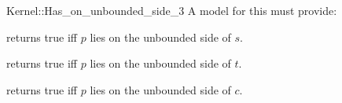 \begin{ccRefFunctionObjectConcept}{Kernel::Has_on_unbounded_side_3}
A model for this must provide:


{returns true iff $p$ lies on the unbounded side of $s$.}

{returns true iff $p$ lies on the unbounded side of $t$.}

{returns true iff $p$ lies on the unbounded side of $c$.}

\ccIsModel{}

\end{ccRefFunctionObjectConcept}
